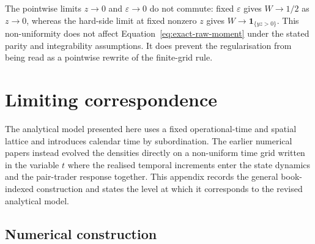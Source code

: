 \documentclass[5p,final]{elsarticle}
\begin{document}
The pointwise limits $z\to0$ and $\varepsilon\to0$ do not commute: fixed $\varepsilon$ gives $W\to1/2$ as $z\to0$, whereas the hard-side limit at fixed nonzero $z$ gives $W\to\mathbf 1_{\{yz>0\}}$. This non-uniformity does not affect Equation~\eqref{eq:exact-raw-moment} under the stated parity and integrability assumptions. It does prevent the regularisation from being read as a pointwise rewrite of the finite-grid rule.

\section{Limiting correspondence}
\label{app:legacy-interpolation}

The analytical model presented here uses a fixed operational-time and spatial lattice and introduces calendar time by subordination. The earlier numerical papers instead evolved the densities directly on a non-uniform time grid written in the variable $t$ \cite{DianaGebbie2025} where the realised temporal increments enter the state dynamics and the pair-trader response together. This appendix records the general book-indexed construction and states the level at which it corresponds to the revised analytical model.

\subsection{Numerical construction}
\end{document}
